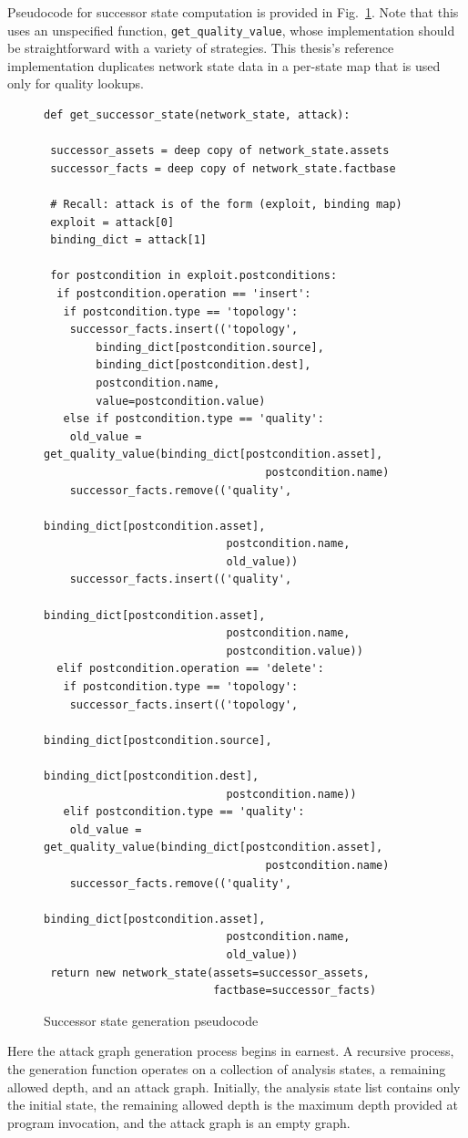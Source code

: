Pseudocode for successor state computation is provided in 
Fig.~\ref{fig:get_succstate_pc}. Note that this uses an unspecified function,
\texttt{get\_quality\_value}, whose implementation should be straightforward
with a variety of strategies. This thesis's reference implementation duplicates
network state data in a per-state map that is used only for quality lookups.
\begin{figure}
\begin{lstlisting}
def get_successor_state(network_state, attack):

 successor_assets = deep copy of network_state.assets
 successor_facts = deep copy of network_state.factbase
 
 # Recall: attack is of the form (exploit, binding map)
 exploit = attack[0]
 binding_dict = attack[1]
 
 for postcondition in exploit.postconditions:
  if postcondition.operation == 'insert':
   if postcondition.type == 'topology':
    successor_facts.insert(('topology',
        binding_dict[postcondition.source],
        binding_dict[postcondition.dest],
        postcondition.name,
        value=postcondition.value)
   else if postcondition.type == 'quality':
    old_value = get_quality_value(binding_dict[postcondition.asset], 
                                  postcondition.name)
    successor_facts.remove(('quality',
                            binding_dict[postcondition.asset],
                            postcondition.name,
                            old_value))
    successor_facts.insert(('quality',
                            binding_dict[postcondition.asset],
                            postcondition.name,
                            postcondition.value))
  elif postcondition.operation == 'delete':
   if postcondition.type == 'topology':
    successor_facts.insert(('topology',
                            binding_dict[postcondition.source],
                            binding_dict[postcondition.dest],
                            postcondition.name))
   elif postcondition.type == 'quality':
    old_value = get_quality_value(binding_dict[postcondition.asset], 
                                  postcondition.name)
    successor_facts.remove(('quality',
                            binding_dict[postcondition.asset],
                            postcondition.name,
                            old_value))
 return new network_state(assets=successor_assets,
                          factbase=successor_facts)
\end{lstlisting}
\label{fig:get_succstate_pc}
\caption{Successor state generation pseudocode}
\end{figure}
Here the attack graph generation process begins in earnest. A recursive process,
the generation function operates on a collection of analysis states, a remaining
allowed depth, and an attack graph. Initially, the analysis state
list contains only the initial state, the remaining allowed depth is the maximum
depth provided at program invocation, and the attack graph is an empty graph.

